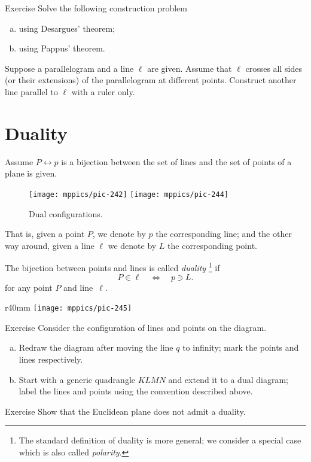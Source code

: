 \begin{thm}{Exercise}\label{ex:desargues-construction}
Solve the following construction problem
\begin{enumerate}[(a)]
\item\label{ex:desargues-construction:desargues} using Desargues' theorem;
\item\label{ex:desargues-construction:pappus} using Pappus' theorem.
\end{enumerate}
Suppose a parallelogram and a line $\ell$ are given.
Assume that $\ell$ crosses all sides (or their extensions) of the parallelogram at different points. 
Construct another line parallel to $\ell$ with a ruler only.
\end{thm}


\section{Duality}

Assume $P\leftrightarrow p$ is a bijection between the set of lines and the set of points of a plane is given.
\begin{figure}[!ht]
\centering
\texttt{[image: mppics/pic-242]}
\hskip15mm
\texttt{[image: mppics/pic-244]}
\caption*{Dual configurations.}
\end{figure}
That is,
given a point $P$, we denote by $p$ the corresponding line;
and the other way around, 
given a line $\ell$ we denote by $L$ the corresponding point. 

The bijection between points and lines is called \emph{duality}\label{page:duality}%
\footnote{The standard definition of duality is more general; we consider a special case which is also called \emph{polarity}.}
if 
\[P\in \ell
\quad
\iff
\quad 
p\ni L.\]
for any point $P$ and line~$\ell$.

{

\begin{wrapfigure}{r}{40mm}
\vskip-8mm
\centering
\texttt{[image: mppics/pic-245]}
\end{wrapfigure}

\begin{thm}{Exercise}\label{ex:dual-configurations}
Consider the configuration of lines and points on the diagram.

\begin{enumerate}[(a)]
\item\label{ex:dual-configurations:infty} Redraw the diagram after moving the line $q$ to infinity; mark the points and lines respectively.

\item\label{ex:dual-configurations:dual} Start with a generic quadrangle $KLMN$ and extend it to a dual diagram; label the lines and points using the convention described above.
\end{enumerate}

\end{thm}

\begin{thm}{Exercise}\label{ex:dual-euclid}
Show that the Euclidean plane does not admit a duality. 
\end{thm}

}


